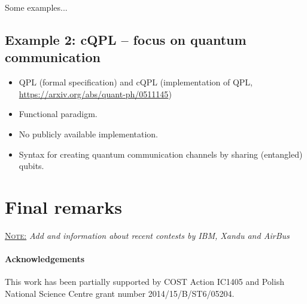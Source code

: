 \documentclass[a4paper,11pt]{article}
\newcommand{\note}[1]{%
    \par\vspace{6pt}\noindent\underline{\textsc{Note:}} \emph{#1}\vspace{6pt}%
}
\begin{document}
Some examples...


\subsection{Example 2: cQPL -- focus on quantum communication}



\begin{itemize}
\item QPL (formal specification) and cQPL (implementation of QPL, 
\url{https://arxiv.org/abs/quant-ph/0511145})
\item Functional paradigm.
\item No publicly available implementation.
\item Syntax for creating quantum communication channels by sharing 
(entangled) qubits.
\end{itemize}

\section{Final remarks}


\note{Add \cite{dyakonov2018case} and information about recent contests by IBM, 
Xandu and AirBus~\cite{airbus-challenge}}

\paragraph{Acknowledgements} This work has been partially supported by COST 
Action IC1405 and Polish National Science Centre grant number 
2014/15/B/ST6/05204.



\end{document}
